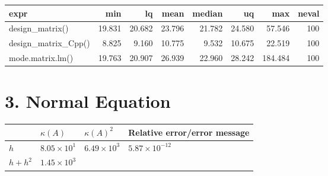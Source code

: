 \documentclass[
]{article}
\begin{document}
\begin{longtable}[]{@{}lrrrrrrr@{}}
\toprule
expr & min & lq & mean & median & uq & max & neval\tabularnewline
\midrule
\endhead
design\_matrix() & 19.831 & 20.682 & 23.796 & 21.782 & 24.580 & 57.546 &
100\tabularnewline
design\_matrix\_Cpp() & 8.825 & 9.160 & 10.775 & 9.532 & 10.675 & 22.519
& 100\tabularnewline
mode.matrix.lm() & 19.763 & 20.907 & 26.939 & 22.960 & 28.242 & 184.484
& 100\tabularnewline
\bottomrule
\end{longtable}

\hypertarget{normal-equation}{%
\section{3. Normal Equation}\label{normal-equation}}

\begin{longtable}[]{@{}llll@{}}
\toprule
\begin{minipage}[b]{0.17\columnwidth}\raggedright
\strut
\end{minipage} & \begin{minipage}[b]{0.16\columnwidth}\raggedright
\(\kappa(A)\)\strut
\end{minipage} & \begin{minipage}[b]{0.16\columnwidth}\raggedright
\(\kappa(A)^{2}\)\strut
\end{minipage} & \begin{minipage}[b]{0.40\columnwidth}\raggedright
Relative error/error message\strut
\end{minipage}\tabularnewline
\midrule
\endhead
\begin{minipage}[t]{0.17\columnwidth}\raggedright
\(h\)\strut
\end{minipage} & \begin{minipage}[t]{0.16\columnwidth}\raggedright
\(8.05 \times 10^{1}\)\strut
\end{minipage} & \begin{minipage}[t]{0.16\columnwidth}\raggedright
\(6.49 \times 10^{3}\)\strut
\end{minipage} & \begin{minipage}[t]{0.40\columnwidth}\raggedright
\(5.87 \times 10^{-12}\)\strut
\end{minipage}\tabularnewline
\begin{minipage}[t]{0.17\columnwidth}\raggedright
\(h+h^{2}\)\strut
\end{minipage} & \begin{minipage}[t]{0.16\columnwidth}\raggedright
\(1.45 \times 10^{3}\)\strut

\end{minipage}
\end{longtable}
\end{document}
